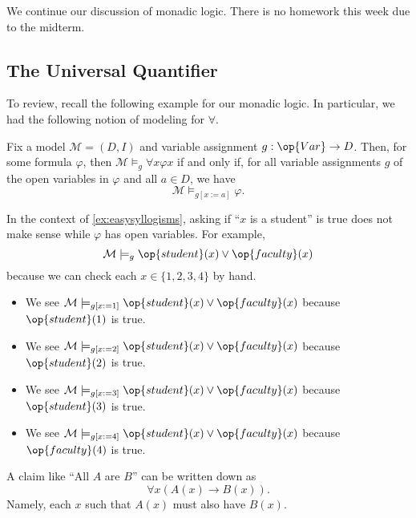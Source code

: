 
We continue our discussion of monadic logic. There is no homework this week due to the midterm.

\subsection{The Universal Quantifier}
To review, recall the following example for our monadic logic.
\easymonad*
In particular, we had the following notion of modeling for $\forall$.
\begin{definition}
	Fix a model $\mathcal M=(D,I)$ and variable assignment $g:\op{Var}\to D$. Then, for some formula $\varphi$, then $\mathcal M\models_g\forall x\varphi x$ if and only if, for all variable assignments $g$ of the open variables in $\varphi$ and all $a\in D$, we have
	\[\mathcal M\models_{g[x:=a]}\varphi.\]
\end{definition}
\begin{example}
	In the context of \autoref{ex:easysyllogisms}, asking if ``$x$ is a student'' is true does not make sense while $\varphi$ has open variables. For example,
	\[\mathcal M\models_g\op{student}(x)\lor\op{faculty}(x)\]
	because we can check each $x\in\{1,2,3,4\}$ by hand.
	\begin{itemize}
		\item We see $\mathcal M\models_{g[x:=1]}\op{student}(x)\lor\op{faculty}(x)$ because $\op{student}(1)$ is true.
		\item We see $\mathcal M\models_{g[x:=2]}\op{student}(x)\lor\op{faculty}(x)$ because $\op{student}(2)$ is true.
		\item We see $\mathcal M\models_{g[x:=3]}\op{student}(x)\lor\op{faculty}(x)$ because $\op{student}(3)$ is true.
		\item We see $\mathcal M\models_{g[x:=4]}\op{student}(x)\lor\op{faculty}(x)$ because $\op{faculty}(4)$ is true.
	\end{itemize}
\end{example}
\begin{remark}
	A claim like ``All $A$ are $B$'' can be written down as
	\[\forall x(A(x)\to B(x)).\]
	Namely, each $x$ such that $A(x)$ must also have $B(x)$.
\end{remark}

